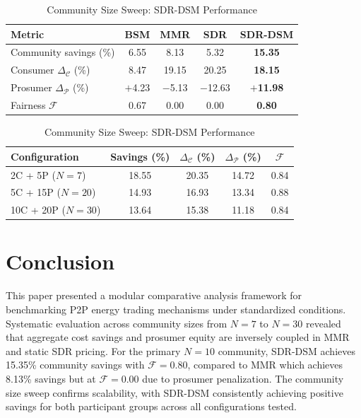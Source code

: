 \documentclass[conference]{IEEEtran}
\begin{document}
\begin{table}[t]
\caption{30-Day Economic Performance Comparison}
\label{tab:economics}
\centering
\footnotesize
\begin{tabular}{lcccc}
\toprule
\textbf{Metric} & \textbf{BSM} & \textbf{MMR} & \textbf{SDR} & \textbf{SDR-DSM} \\
\midrule
Community savings (\%) & 6.55 & 8.13 & 5.32 & \textbf{15.35} \\
Consumer $\Delta_{\mathcal{C}}$ (\%) & 8.47 & 19.15 & 20.25 & \textbf{18.15} \\
Prosumer $\Delta_{\mathcal{P}}$ (\%) & $+$4.23 & $-$5.13 & $-$12.63 & \textbf{$+$11.98} \\
Fairness $\mathcal{F}$ & 0.67 & 0.00 & 0.00 & \textbf{0.80} \\
\bottomrule
\end{tabular}
\vspace{8pt}
\caption{Community Size Sweep: SDR-DSM Performance}
\label{tab:sweep}
\vspace{4pt}
\begin{tabular}{lcccc}
\toprule
\textbf{Configuration} & \textbf{Savings (\%)} & $\Delta_{\mathcal{C}}$ \textbf{(\%)} & $\Delta_{\mathcal{P}}$ \textbf{(\%)} & $\mathcal{F}$ \\
\midrule
2C + 5P ($N=7$) & 18.55 & 20.35 & 14.72 & 0.84 \\
5C + 15P ($N=20$) & 14.93 & 16.93 & 13.34 & 0.88 \\
10C + 20P ($N=30$) & 13.64 & 15.38 & 11.18 & 0.84 \\
\bottomrule
\end{tabular}
\end{table}

\section{Conclusion}

This paper presented a modular comparative analysis framework for benchmarking P2P energy trading mechanisms under standardized conditions. Systematic evaluation across community sizes from $N=7$ to $N=30$ revealed that aggregate cost savings and prosumer equity are inversely coupled in MMR and static SDR pricing. For the primary $N=10$ community, SDR-DSM achieves 15.35\% community savings with $\mathcal{F} = 0.80$, compared to MMR which achieves 8.13\% savings but at $\mathcal{F} = 0.00$ due to prosumer penalization. The community size sweep confirms scalability, with SDR-DSM consistently achieving positive savings for both participant groups across all configurations tested.
\end{document}
